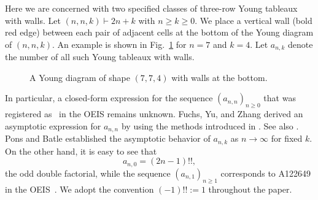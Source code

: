 \documentclass[reqno, 12pt]{article}
\theoremstyle{mydefinition}
\theoremstyle{myremark}
\numberwithin{algorithm}{section}
\begin{document}
Here we are concerned  with two specified  classes of three-row Young tableaux with walls. Let $(n,n,k)\vdash2n+k$ with $n\geq k\geq 0$.
We place a vertical wall (bold red edge) between each pair of adjacent cells at the bottom of the Young diagram of $(n,n,k)$.
An example is shown in Fig.~\ref{tab:ank} for $n=7$ and $k=4$. Let $a_{n,k}$ denote the number of all such Young tableaux with walls.
\begin{figure}[htbp]
\centering
{}
\caption{A Young diagram of shape $(7,7,4)$ with walls at the bottom.}
\label{tab:ank}
\end{figure}
In particular, a closed-form expression for the sequence $(a_{n,n})_{n\geq 0}$ that was registered  as~\cite[A213863]{Sloane23} in the OEIS remains unknown.
Fuchs, Yu, and Zhang \cite{FYZ} derived an asymptotic expression for $a_{n,n}$ by using the methods introduced in \cite{EFW21}.
See also \cite[Theorem 4.1]{C.Banderier21}.
Pons and Batle \cite[Proposition 7]{PB} established the asymptotic behavior of $a_{n,k}$ as $n\rightarrow \infty$ for fixed $k$.
On the other hand, it is easy to see that
\begin{equation}\label{eq:an0}
a_{n,0}=(2n-1)!!,
\end{equation}
the odd double factorial, while the sequence $(a_{n,1})_{n\geq 1}$ corresponds to A122649 in the OEIS~\cite{Sloane23}.
We adopt the convention $(-1)!!:=1$ throughout the paper.
\end{document}
